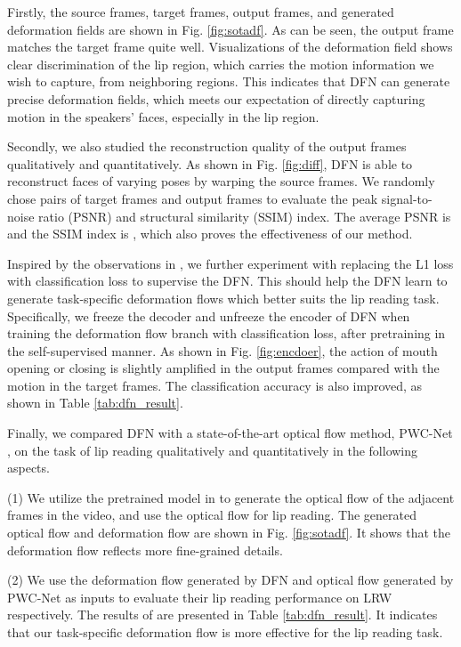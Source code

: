 \documentclass[a4paper, 10pt, conference]{ieeeconf}      \usepackage{FG2020}
\begin{document}
 Firstly, the source frames, target frames, output frames, and generated deformation fields are shown in Fig. \ref{fig:sotadf}. As can be seen, the output frame matches the target frame quite well. Visualizations of the deformation field shows clear discrimination of the lip region, which carries the motion information we wish to capture, from neighboring regions. This indicates that DFN can generate precise deformation fields, which meets our expectation of directly capturing motion in the speakers' faces, especially in the lip region. 
 
 Secondly, we also studied the reconstruction quality of the output frames qualitatively and quantitatively. As shown in Fig. \ref{fig:diff}, DFN is able to reconstruct faces of varying poses by warping the source frames. We randomly chose  pairs of target frames and output frames to evaluate the peak signal-to-noise ratio (PSNR) and structural similarity (SSIM) index. The average PSNR is  and the SSIM index is , which also proves the effectiveness of our method.


 Inspired by the observations in \cite{SevillaLara2017OnTI}, we further experiment with replacing the L1 loss with classification loss to supervise the DFN. This should help the DFN learn to generate task-specific deformation flows which better suits the lip reading task. 
Specifically, we freeze the decoder and unfreeze the encoder of DFN when training the deformation flow branch with classification loss, after pretraining in the self-supervised manner.
 As shown in Fig. \ref{fig:encdoer}, the action of mouth opening or closing is slightly amplified in the output frames compared with the motion in the target frames. 
The classification accuracy is also improved, as shown in Table \ref{tab:dfn_result}.
 
 Finally, we compared DFN with a state-of-the-art optical flow method, PWC-Net \cite{sun2018pwc}, on the task of lip reading qualitatively and quantitatively in the following aspects. 
 
(1) We utilize the pretrained model in \cite{sun2018pwc} to generate the optical flow of the adjacent frames in the video, and use the optical flow for lip reading.  The generated optical flow and deformation flow are shown in Fig. \ref{fig:sotadf}. It shows that the deformation flow reflects more fine-grained details.

(2) We use the deformation flow generated by DFN and optical flow generated by PWC-Net as inputs to evaluate their lip reading performance on LRW respectively. The results of are presented in Table \ref{tab:dfn_result}. It indicates that our task-specific deformation flow is more effective for the lip reading task.
\end{document}
